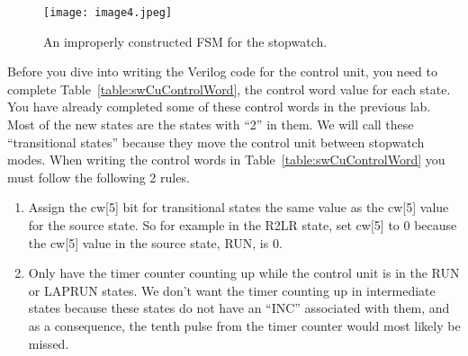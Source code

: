 \begin{figure}[ht]
\texttt{[image: image4.jpeg]}
\caption{An improperly constructed FSM for the stopwatch.}
\label{fig:swCuImproperFsm}
\end{figure}

Before you dive into writing the Verilog code for the control unit, you
need to complete Table~\ref{table:swCuControlWord}, the control word value for each state. You
have already completed some of these control words in the previous lab.
Most of the new states are the states with ``2'' in them. We will call
these ``transitional states'' because they move the control unit between
stopwatch modes. When writing the control words in Table~\ref{table:swCuControlWord} you must
follow the following 2 rules.

\begin{enumerate}
\def\labelenumi{\arabic{enumi})}
\item
  Assign the cw{[}5{]} bit for transitional states the same value as the
  cw{[}5{]} value for the source state. So for example in the R2LR
  state, set cw{[}5{]} to 0 because the cw{[}5{]} value in the source
  state, RUN, is 0.
\item
  Only have the timer counter counting up while the control unit is in
  the RUN or LAPRUN states. We don't want the timer counting up in
  intermediate states because these states do not have an ``INC''
  associated with them, and as a consequence, the tenth pulse from the
  timer counter would most likely be missed.
\end{enumerate}

